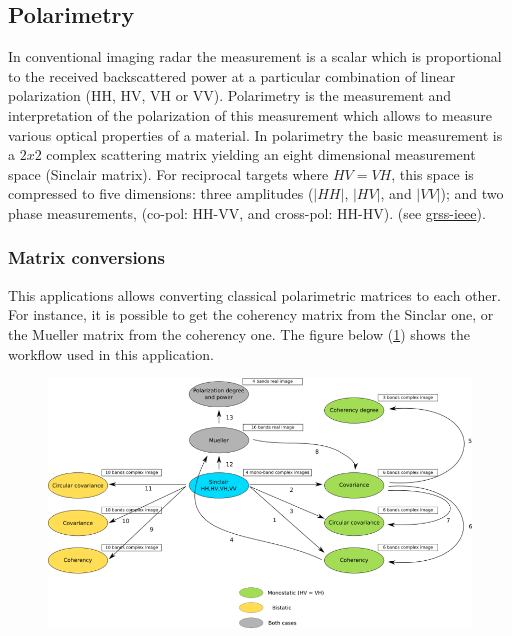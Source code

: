 \subsection{Polarimetry}

In conventional imaging radar the measurement is a scalar which is 
proportional to the received backscattered power at a particular combination 
of linear polarization (HH, HV, VH or VV). 
Polarimetry is the measurement and interpretation of the polarization of this measurement which
allows to measure various optical properties of a material.
In polarimetry the basic measurement is a $2x2$ complex scattering
matrix yielding an eight dimensional measurement space (Sinclair
matrix). For reciprocal targets where $HV=VH$, this space is
compressed to five dimensions: three amplitudes ($|HH|$, $|HV|$, and
$|VV|$); and two phase measurements, (co-pol: HH-VV, and cross-pol:
HH-HV). (see \href{http://www.grss-ieee.org/technical-briefs/imaging-radar-polarimetry}{grss-ieee}).

\subsubsection{Matrix conversions}

This applications allows converting classical polarimetric matrices to each other.
For instance, it is possible to get the coherency matrix from the Sinclar one, or the Mueller matrix from the coherency one.
The figure below (\ref{fig:polconv}) shows the workflow used in this application.

\begin{figure}[h!]
  \centering
   \includegraphics[width=\textwidth]{../Art/sarpol_conversion_schema.png}
  \label{fig:polconv}
\end{figure}

